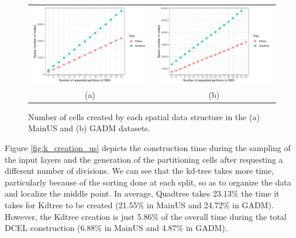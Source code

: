  \begin{figure}
     \centering
     \begin{tabular}{cc}
         \includegraphics[width=0.49\linewidth]{chapterSDCEL/K_Space_US.pdf} & \includegraphics[width=0.49\linewidth]{chapterSDCEL/K_Space_GADM.pdf} \\
         (a) & (b)
     \end{tabular}
     \caption{Number of cells created by each spatial data structure in the (a) MainUS and (b) GADM datasets.} \label{fig:k_space_us}
 \end{figure}

Figure \ref{fig:k_creation_us} depicts the construction time during the sampling of the input layers and the generation of the partitioning cells after requesting a different number of divisions. We can see that the kd-tree takes more time, particularly because of the sorting done at each split, so as to organize the data and localize the middle point. In average, Quadtree takes 23.13\% the time it takes for Kdtree to be created (21.55\% in MainUS and 24.72\% in GADM). However, the Kdtree creation is just 5.86\% of the overall time during the total DCEL construction (6.88\% in MainUS and 4.87\% in GADM).

